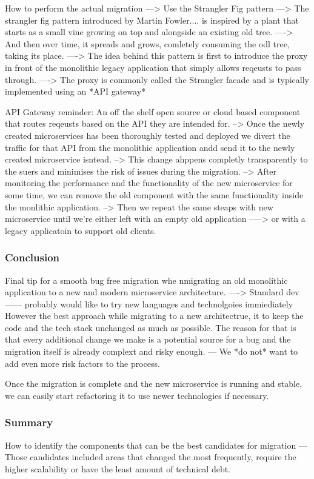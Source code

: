 \documentclass[a4paper, 11pt]{book}
\begin{document}
    How to perform the actual migration
    ---> Use the Strangler Fig pattern
    ---> The strangler fig pattern introduced by Martin Fowler.... is inspired by a plant that starts as a small vine growing on top and alongside an existing old tree.
    ----> And then over time, it spreads and grows, comletely consuming the odl tree, taking its place.
    ----> The idea behind this pattern is first to introduce the proxy in front of the monolithic legacy application that simply allows reqeusts to pass through.
    ----> The proxy is commonly called the Strangler facade and is typically implemented using an *API gateway*

    API Gateway reminder: An off the shelf open source or cloud based component that routes reqeusts based on the API they are intended for.
    --> Once the newly created microservices has been thoroughly tested and deployed we divert the traffic for that API from the monolithic application andd send it to the newly created microservice isntead.
    --> This change ahppens completly transparently to the suers and minimises the risk of issues during the migration.
    --> After monitoring the performance and the functionality of the new microservice for some time, we can remove the old component with the same functionality inside the monlithic application.
    --> Then we repeat the same steaps with new microservice until we're either left with an empty old application
    -----> or with a legacy applicatoin to support old clients.

    \subsubsection{Conclusion}
    Final tip for a smooth bug free migration whe nmigrating an old monolithic application to a new and modern microservice architecture.
    ----> Standard dev------ probably would like to try new languages and technolgoies immiediately
    However the best approach while migrating to a new architectrue, it to keep the code and the tech stack unchanged as much as possible.
    The reason for that is that every additional change we make is a potential source for a bug and the migration itself is already complext and risky enough.
    --- We *do not* want to add even more risk factors to the process.

    Once the migration is complete and the new microservice is running and stable, we can easily start refactoring it to use newer technologies if necessary.

    \subsubsection{Summary}
    How to identify the components that can be the best candidates for migration
    --- Those candidates included areas that changed the most frequently, require the higher scalability or have the least amount of technical debt.
\end{document}
